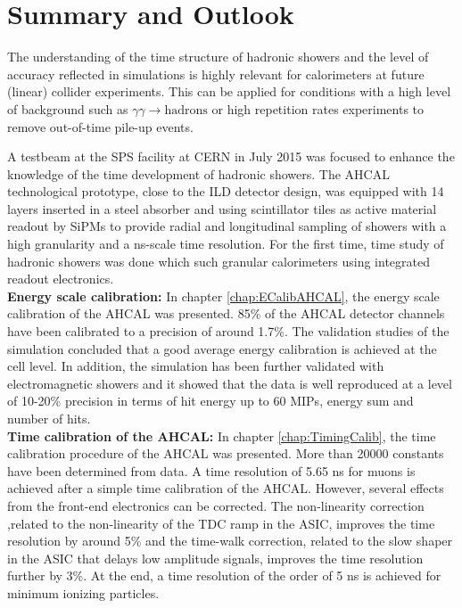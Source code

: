 \section{Summary and Outlook}

The understanding of the time structure of hadronic showers and the level of accuracy reflected in \geant simulations is highly relevant for calorimeters at future (linear) collider experiments. This can be applied for conditions with a high level of background such as $\gamma\gamma \rightarrow \text{hadrons}$ or high repetition rates experiments to remove out-of-time pile-up events.

A testbeam at the SPS facility at CERN in July 2015 was focused to enhance the knowledge of the time development of hadronic showers. The AHCAL technological prototype, close to the ILD detector design, was equipped with 14 layers inserted in a steel absorber and using scintillator tiles as active material readout by SiPMs to provide radial and longitudinal sampling of showers with a high granularity and a ns-scale time resolution. For the first time, time study of hadronic showers was done which such granular calorimeters using integrated readout electronics.\\[0.1cm]

\noindent\textbf{Energy scale calibration:} In chapter \ref{chap:ECalibAHCAL}, the energy scale calibration of the AHCAL was presented. 85\% of the AHCAL detector channels have been calibrated to a precision of around 1.7\%. The validation studies of the simulation concluded that a good average energy calibration is achieved at the cell level. In addition, the simulation has been further validated with electromagnetic showers and it showed that the data is well reproduced at a level of 10-20\% precision in terms of hit energy up to 60 MIPs, energy sum and number of hits.\\[0.1cm]

\noindent\textbf{Time calibration of the AHCAL:} In chapter \ref{chap:TimingCalib}, the time calibration procedure of the AHCAL was presented. More than 20000 constants have been determined from data. A time resolution of 5.65 ns for muons is achieved after a simple time calibration of the AHCAL. However, several effects from the front-end electronics can be corrected. The non-linearity correction ,related to the non-linearity of the TDC ramp in the ASIC, improves the time resolution by around 5\% and the time-walk correction, related to the slow shaper in the ASIC that delays low amplitude signals, improves the time resolution further by 3\%. At the end, a time resolution of the order of 5 ns is achieved for minimum ionizing particles.\\[0.1cm]

